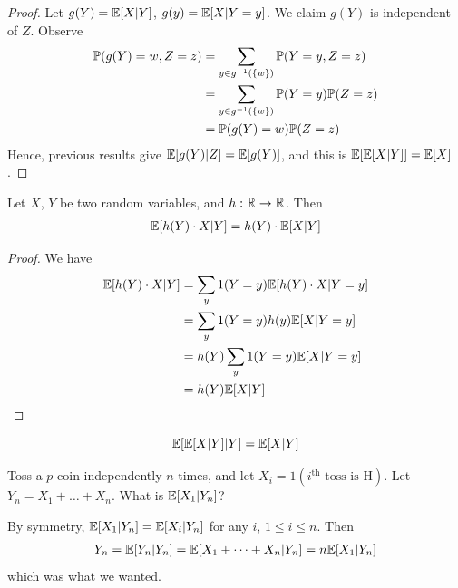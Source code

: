 \documentclass{../../template/note}
\begin{document}
    \begin{proof}
        Let \(g(Y) = \mathbb E[X | Y]\), \(g(y) = \mathbb E[X | Y = y]\). We claim \(g(Y)\) is independent of \(Z\). Observe
        \begin{align*}
            \mathbb P(g(Y) = w, Z = z) &= \sum_{y \in g^{-1}(\{w\})} \mathbb P(Y = y, Z = z) \\
            &= \sum_{y \in g^{-1}(\{w\})} \mathbb P(Y = y) \mathbb P(Z = z) \\
            &= \mathbb P(g(Y) = w) \mathbb P(Z = z)
        \end{align*}
        Hence, previous results give \(\mathbb E[g(Y) | Z] = \mathbb E[g(Y)]\), and this is \(\mathbb E[\mathbb E[X | Y]] = \mathbb E[X]\).        
    \end{proof}
    
    \begin{proposition}
        Let \(X\), \(Y\) be two random variables, and \(h: \mathbb R \to \mathbb R\). Then
        \begin{align*}
            \mathbb E[h(Y) \cdot X | Y] = h(Y) \cdot \mathbb E[X | Y]
        \end{align*}
    \end{proposition}
    
    \begin{proof}
        We have
        \begin{align*}
            \mathbb E[h(Y) \cdot X | Y] &= \sum_y 1(Y = y) \mathbb E[h(Y) \cdot X | Y = y] \\
            &= \sum_y 1(Y = y) h(y) \mathbb E[X | Y = y] \\
            &= h(Y) \sum_y 1(Y = y) \mathbb E[X | Y = y] \\
            &= h(Y) \mathbb E[X | Y]
        \end{align*}
    \end{proof}
    
    \begin{corollary}
        \[\mathbb E[\mathbb E[X | Y] | Y] = \mathbb E[X | Y]\]
    \end{corollary}
    
    \begin{example*}
        Toss a \(p\)-coin independently \(n\) times, and let \(X_i = 1(i^\text{th} \text{ toss is H})\). Let \(Y_n = X_1 + \dots + X_n\). What is \(\mathbb E[X_1 | Y_n]\)?

        By symmetry, \(\mathbb E[X_1 | Y_n] = \mathbb E[X_i | Y_n]\) for any \(i\), \(1 \leq i \leq n\). Then
        \begin{align*}
            Y_n = \mathbb E[Y_n | Y_n] = \mathbb E[X_1 + \dots + X_n | Y_n] = n \mathbb E[X_1 | Y_n] 
        \end{align*}
        which was what we wanted.
    \end{example*}
    
\end{document}
